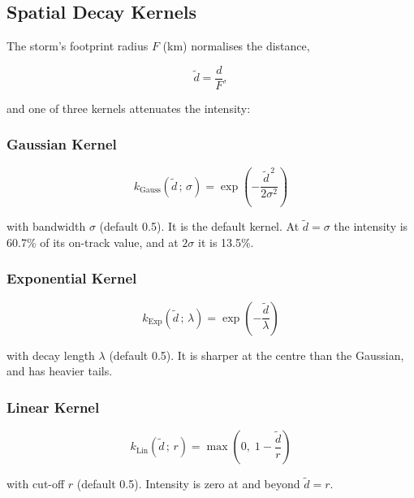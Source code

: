 \documentclass[11pt,a4paper]{article}
\begin{document}
\subsection{Spatial Decay Kernels}
\label{sec:decay_kernels}

The storm's footprint radius $F$ (km) normalises the distance,

\begin{equation}
    \tilde{d} = \frac{d}{F},
    \label{eq:d_norm}
\end{equation}

\noindent and one of three kernels attenuates the intensity:

\subsubsection{Gaussian Kernel}
\begin{equation}
    k_{\text{Gauss}}(\tilde{d}\,;\,\sigma) =
        \exp\!\left(-\frac{\tilde{d}^{\,2}}{2\sigma^2}\right)
    \label{eq:gaussian_kernel}
\end{equation}

\noindent with bandwidth $\sigma$ (default 0.5). It is the default kernel. At
$\tilde{d} = \sigma$ the intensity is 60.7\% of its on-track value, and at $2\sigma$
it is 13.5\%.

\subsubsection{Exponential Kernel}
\begin{equation}
    k_{\text{Exp}}(\tilde{d}\,;\,\lambda) =
        \exp\!\left(-\frac{\tilde{d}}{\lambda}\right)
    \label{eq:exponential_kernel}
\end{equation}

\noindent with decay length $\lambda$ (default 0.5). It is sharper at the centre than
the Gaussian, and has heavier tails.

\subsubsection{Linear Kernel}
\begin{equation}
    k_{\text{Lin}}(\tilde{d}\,;\,r) =
        \max\!\left(0,\; 1 - \frac{\tilde{d}}{r}\right)
    \label{eq:linear_kernel}
\end{equation}

\noindent with cut-off $r$ (default 0.5). Intensity is zero at and beyond $\tilde{d}=r$.
\end{document}
